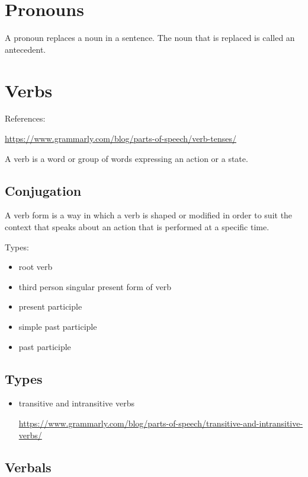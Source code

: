 \documentclass{book}
\begin{document}
\chapter{Pronouns}

A pronoun replaces a noun in a sentence. The noun that is replaced is called an antecedent. 

\chapter{Verbs}

References:

\url{https://www.grammarly.com/blog/parts-of-speech/verb-tenses/}

A verb is a word or group of words expressing an action or a state.

\section{Conjugation}

A verb form\label{Verbs!verb form} is a way in which a verb is shaped or modified in order to suit the context that speaks about an action that is performed at a specific time.

Types:
\begin{itemize}
	\item root verb
	\item third person singular present form of verb
	\item present participle
	\item simple past participle
	\item past participle
\end{itemize}

\section{Types}

\begin{itemize}
	\item transitive and intransitive verbs
	      
	      \url{https://www.grammarly.com/blog/parts-of-speech/transitive-and-intransitive-verbs/}
\end{itemize}

\section{Verbals}
\end{document}
